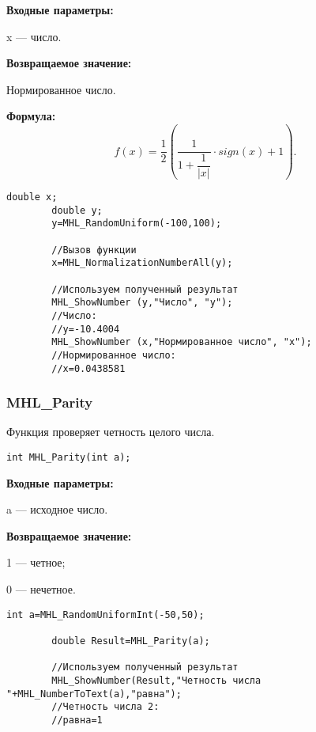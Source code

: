 \documentclass[a4paper,12pt]{article}
\begin{document}
\textbf{Входные параметры:}

 x --- число.

\textbf{Возвращаемое значение:}
 
Нормированное число.
 
\textbf{Формула:}
\begin{equation*}
f\left(x \right)=\frac{1}{2}\left( \dfrac{1}{1+\dfrac{1}{\left| x\right| }}\cdot sign \left( x\right)+1 \right) .
\end{equation*}


\begin{lstlisting}[label=code_use_MHL_NormalizationNumberAll,caption=Пример использования]
        double x;
        double y;
        y=MHL_RandomUniform(-100,100);

        //Вызов функции
        x=MHL_NormalizationNumberAll(y);

        //Используем полученный результат
        MHL_ShowNumber (y,"Число", "y");
        //Число:
        //y=-10.4004
        MHL_ShowNumber (x,"Нормированное число", "x");
        //Нормированное число:
        //x=0.0438581
\end{lstlisting}

\subsubsection{MHL\_Parity}\label{MHL_Parity}

Функция проверяет четность целого числа.


\begin{lstlisting}[label=code_syntax_MHL_Parity,caption=Синтаксис]
int MHL_Parity(int a);
\end{lstlisting}

\textbf{Входные параметры:}  
 
a --- исходное число.

\textbf{Возвращаемое значение:}

 1 --- четное;
 
 0 --- нечетное.


\begin{lstlisting}[label=code_use_MHL_Parity,caption=Пример использования]
        int a=MHL_RandomUniformInt(-50,50);

        double Result=MHL_Parity(a);

        //Используем полученный результат
        MHL_ShowNumber(Result,"Четность числа "+MHL_NumberToText(a),"равна");
        //Четность числа 2:
        //равна=1
\end{lstlisting}
\end{document}

